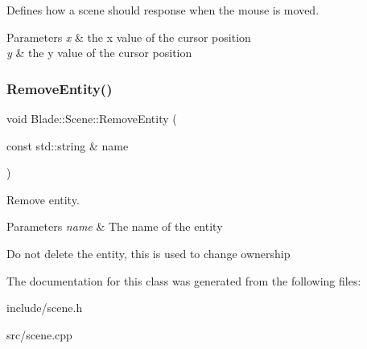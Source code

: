 Defines how a scene should response when the mouse is moved. 


\begin{DoxyParams}{Parameters}
{\em x} & the x value of the cursor position \\
\hline
{\em y} & the y value of the cursor position \\
\hline
\end{DoxyParams}
\mbox{\label{class_blade_1_1_scene_ae04a504f28ab2c80099863d067cb6914}} 
\subsubsection{\texorpdfstring{Remove\+Entity()}{RemoveEntity()}}
{\footnotesize\ttfamily void Blade\+::\+Scene\+::\+Remove\+Entity (\begin{DoxyParamCaption}\item[{const std\+::string \&}]{name }\end{DoxyParamCaption})\hspace{0.3cm}{\ttfamily [noexcept]}}



Remove entity. 


\begin{DoxyParams}{Parameters}
{\em name} & The name of the entity\\
\hline
\end{DoxyParams}
Do not delete the entity, this is used to change ownership 

The documentation for this class was generated from the following files\+:\begin{DoxyCompactItemize}
\item 
include/scene.\+h\item 
src/scene.\+cpp\end{DoxyCompactItemize}
